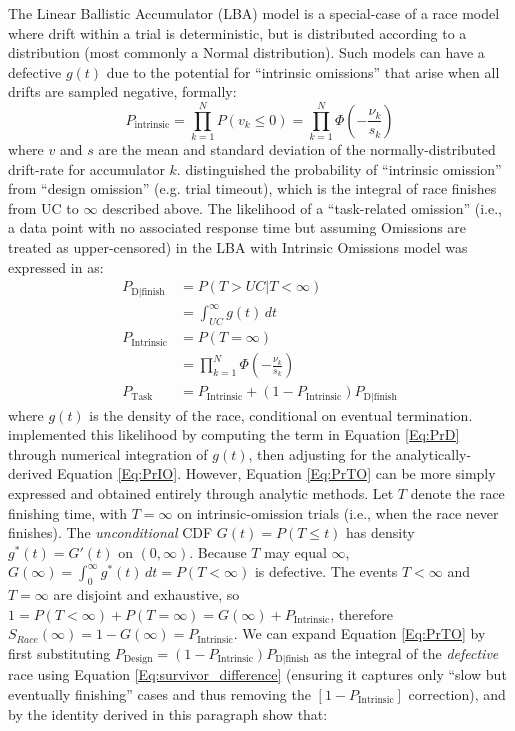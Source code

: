 \documentclass[12pt,a4paper,one side]{article}
\begin{document}
The Linear Ballistic Accumulator (LBA) model \parencite{brown2008simplest} is a special-case of a race model where drift within a trial is deterministic, but is distributed according to a distribution (most commonly a Normal distribution). Such models can have a defective $g(t)$ due to the potential for ``intrinsic omissions'' that arise when all drifts are sampled negative, formally: 
\begin{equation}
    P_{\text{intrinsic}} = \prod_{k=1}^{N} P(v_k \leq 0) = \prod_{k=1}^{N} \Phi\left( -\frac{\nu_k}{s_k} \right)
\end{equation}
where $v$ and $s$ are the mean and standard deviation of the normally-distributed drift-rate for accumulator $k$. \textcite{damaso2022cognitive} distinguished the probability of ``intrinsic omission'' from ``design omission'' (e.g. trial timeout), which is the integral of race finishes from UC to $\infty$ described above. The likelihood of a ``task-related omission'' (i.e., a data point with no associated response time but assuming Omissions are treated as upper-censored) in the LBA with Intrinsic Omissions model was expressed in \textcite{damaso2022cognitive} as: 
\begin{subequations}
\begin{align}
    P_{\text{D|finish}} &= P(T > UC|T <\infty) \nonumber  \\ 
    &= \int_{UC}^{\infty} g(t) \, dt \label{Eq:PrD}  \\
    P_{\text{Intrinsic}} &= P(T = \infty) \nonumber  \\
    &= \prod_{k=1}^{N} \Phi\left( -\frac{\nu_k}{s_k} \right) \label{Eq:PrIO} \\
    P_{\text{Task}} &= P_{\text{Intrinsic}} + (1-P_{\text{Intrinsic}})P_{\text{D|finish}} \label{Eq:PrTO}
\end{align}
\end{subequations}
where $g(t)$ is the density of the race, conditional on eventual termination. \textcite{damaso2022cognitive} implemented this likelihood by computing the term in Equation \ref{Eq:PrD} through numerical integration of $g(t)$, then adjusting for the analytically-derived Equation \ref{Eq:PrIO}. However, Equation \ref{Eq:PrTO} can be more simply expressed and obtained entirely through analytic methods. Let $T$ denote the race finishing time, with $T=\infty$ on intrinsic-omission trials (i.e., when the race never finishes). The \textit{unconditional} CDF $G(t) = P(T \leq t)$ has density $g^*(t) = G'(t)$ on $(0, \infty)$. Because $T$ may equal $\infty$, $G(\infty) = \int_{0}^{\infty} g^*(t) \, dt = P(T < \infty)$ is defective. The events ${T < \infty}$ and ${T = \infty}$ are disjoint and exhaustive, so $1=P(T <\infty) +P(T = \infty) = G(\infty) +P_{\text{Intrinsic}}$, therefore $S_{Race}(\infty) = 1 - G(\infty) = P_{\text{Intrinsic}}$. We can expand Equation \ref{Eq:PrTO} by first substituting $P_{\text{Design}} = (1-P_{\text{Intrinsic}})P_{\text{D|finish}}$ as the integral of the \textit{defective} race using Equation \ref{Eq:survivor_difference} (ensuring it captures only ``slow but eventually finishing'' cases and thus removing the $[1-P_{\text{Intrinsic}}]$ correction), and by the identity derived in this paragraph show that:
\end{document}
